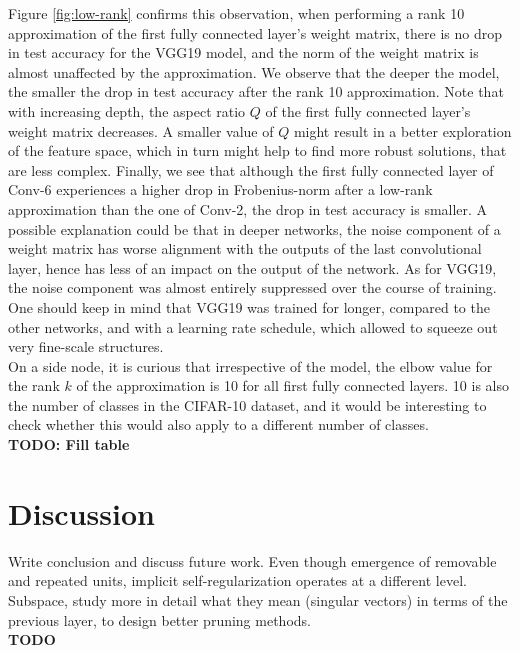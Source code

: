 Figure \ref{fig:low-rank} confirms this observation, when performing a rank 10 approximation of the first fully connected layer's weight matrix, there is no drop in test accuracy for the VGG19 model, and the norm of the weight matrix is almost unaffected by the approximation. We observe that the deeper the model, the smaller the drop in test accuracy after the rank 10 approximation. Note that with increasing depth, the aspect ratio $Q$ of the first fully connected layer's weight matrix decreases. A smaller value of $Q$ might result in a better exploration of the feature space, which in turn might help to find more robust solutions, that are less complex. Finally, we see that although the first fully connected layer of Conv-6 experiences a higher drop in Frobenius-norm after a low-rank approximation than the one of Conv-2, the drop in test accuracy is smaller. A possible explanation could be that in deeper networks, the noise component of a weight matrix has worse alignment with the outputs of the last convolutional layer, hence has less of an impact on the output of the network. As for VGG19, the noise component was almost entirely suppressed over the course of training. One should keep in mind that VGG19 was trained for longer, compared to the other networks, and with a learning rate schedule, which allowed to squeeze out very fine-scale structures. \\

On a side node, it is curious that irrespective of the model, the elbow value for the rank $k$ of the approximation is 10 for all first fully connected layers. 10 is also the number of classes in the CIFAR-10 dataset, and it would be interesting to check whether this would also apply to a different number of classes. \\

\textbf{TODO: Fill table}

\section{Discussion}

Write conclusion and discuss future work. Even though emergence of removable and repeated units, implicit self-regularization operates at a different level. Subspace, study more in detail what they mean (singular vectors) in terms of the previous layer, to design better pruning methods. \\

\textbf{TODO}

\nocite{*}
\printbibliography


